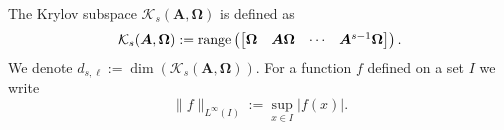 The Krylov subspace $\mathcal{K}_s(\bm{A},\bm{\Omega})$ is defined as
\begin{equation*}
    \mathcal{K}_{s}(\bm{A},\bm{\Omega}) := \operatorname{range}\left(\begin{bmatrix} \bm{\Omega} & \bm{A} \bm{\Omega} & \cdots & \bm{A}^{s-1} \bm{\Omega} \end{bmatrix}\right).
\end{equation*}
We denote $d_{s,\ell} := \dim(\mathcal{K}_s(\bm{A},\bm{\Omega}))$. For a function $f$ defined on a set $I$ we write
\begin{equation*}
    \|f\|_{L^{\infty}(I)} := \sup\limits_{x \in I}|f(x)|.
\end{equation*}